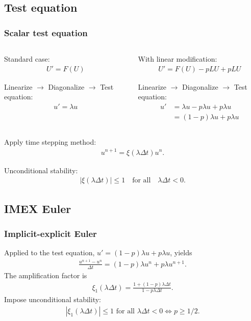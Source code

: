 \documentclass[hyperref={pdfpagelabels=false}]{beamer}
\begin{document}
\subsection{Test equation}
\begin{frame}
	\frametitle{Scalar test equation}
	\begin{columns}
\begin{column}{0.46\textwidth}
	Standard case:
	\begin{align*} 
		U' = F(U)
	\end{align*} 

Linearize $\to$ Diagonalize $\to$ Test equation: 
	\begin{align*} 
		u' = \lambda u
	\end{align*} 
\end{column}
\begin{column}{0.46\textwidth}
	With linear modification: 
	\begin{align*} 
		U' = F(U) - pLU + pLU
	\end{align*}

Linearize $\to$ Diagonalize $\to$ Test equation: 
	\begin{align*}
		u' &= \lambda u - p\lambda u + p\lambda u 
\\
		&= (1-p)\lambda u + p\lambda u 
	\end{align*}
\end{column}
	\end{columns}
Apply time stepping method: 
	\begin{align*} 
		u^{n+1} = \xi(\lambda\Delta t) u^n.
	\end{align*} 

Unconditional stability: 
	\begin{align*}
		\left\vert \xi(\lambda\Delta t)\right\vert \leq 1
		\quad\text{for all}\quad \lambda\Delta t < 0.
	\end{align*}
\end{frame}

\subsection{IMEX Euler}
\begin{frame}
	\frametitle{Implicit-explicit Euler} 
Applied to the test equation, $u' = (1-p)\lambda u + p\lambda u$, yields 
	\begin{align*}
		\frac{u^{n+1} - u^n}{\Delta t} = (1-p)\lambda u^n + p\lambda u^{n+1}.
	\end{align*}
The amplification factor is 
	\begin{align*}
		\xi_1(\lambda\Delta t) 
		= \frac{1 + (1-p)\lambda\Delta t}{1 - p\lambda\Delta t}. 
	\end{align*}
Impose unconditional stability: 
	\begin{align*}
		\left\vert \xi_1(\lambda\Delta t)\right \vert \leq 1  
		\text{ for all }\lambda \Delta t < 0 \iff p \geq 1/2.
	\end{align*}
\end{frame}
\end{document}
